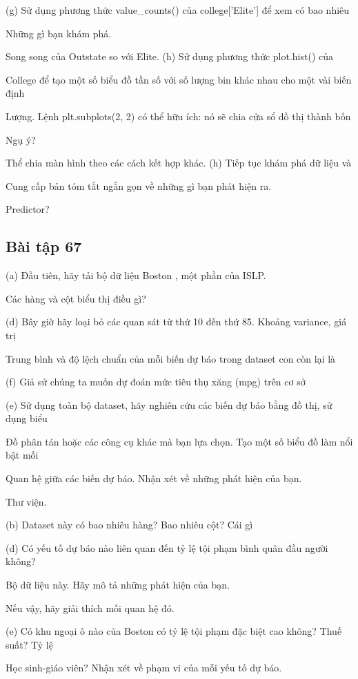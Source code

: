 (g) Sử dụng phương thức value\_counts() của college['Elite'] để xem có bao nhiêu

Những gì bạn khám phá.

Song song của Outstate so với Elite. (h) Sử dụng phương thức plot.hist() của

College để tạo một số biểu đồ tần số với số lượng bin khác nhau cho một vài biến định

Lượng. Lệnh plt.subplots(2, 2) có thể hữu ích: nó sẽ chia cửa sổ đồ thị thành bốn

Ngụ ý?

Thể chia màn hình theo các cách kết hợp khác. (h) Tiếp tục khám phá dữ liệu và

Cung cấp bản tóm tắt ngắn gọn về những gì bạn phát hiện ra.

Predictor?

\subsection{Bài tập 67}

(a) Đầu tiên, hãy tải bộ dữ liệu Boston , một phần của ISLP.

Các hàng và cột biểu thị điều gì?

(d) Bây giờ hãy loại bỏ các quan sát từ thứ 10 đến thứ 85. Khoảng variance, giá trị

Trung bình và độ lệch chuẩn của mỗi biến dự báo trong dataset con còn lại là

(f) Giả sử chúng ta muốn dự đoán mức tiêu thụ xăng (mpg) trên cơ sở

(e) Sử dụng toàn bộ dataset, hãy nghiên cứu các biến dự báo bằng đồ thị, sử dụng biểu

Đồ phân tán hoặc các công cụ khác mà bạn lựa chọn. Tạo một số biểu đồ làm nổi bật mối

Quan hệ giữa các biến dự báo. Nhận xét về những phát hiện của bạn.

Thư viện.

(b) Dataset này có bao nhiêu hàng? Bao nhiêu cột? Cái gì

(d) Có yếu tố dự báo nào liên quan đến tỷ lệ tội phạm bình quân đầu người không?

Bộ dữ liệu này. Hãy mô tả những phát hiện của bạn.

Nếu vậy, hãy giải thích mối quan hệ đó.

(e) Có khu ngoại ô nào của Boston có tỷ lệ tội phạm đặc biệt cao không? Thuế suất? Tỷ lệ

Học sinh-giáo viên? Nhận xét về phạm vi của mỗi yếu tố dự báo.

